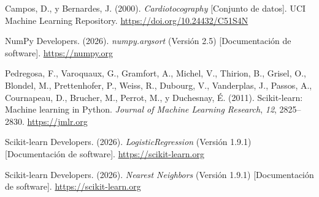 \documentclass[10pt,a4paper,twocolumn]{article}
\begin{document}
\noindent\hangindent=1.27cm
Campos, D., y Bernardes, J. (2000). \textit{Cardiotocography} [Conjunto de datos]. UCI Machine Learning Repository. \url{https://doi.org/10.24432/C51S4N}

\noindent\hangindent=1.27cm
NumPy Developers. (2026). \textit{numpy.argsort} (Versión 2.5) [Documentación de software]. \url{https://numpy.org}

\noindent\hangindent=1.27cm
Pedregosa, F., Varoquaux, G., Gramfort, A., Michel, V., Thirion, B., Grisel, O., Blondel, M., Prettenhofer, P., Weiss, R., Dubourg, V., Vanderplas, J., Passos, A., Cournapeau, D., Brucher, M., Perrot, M., y Duchesnay, É. (2011). Scikit-learn: Machine learning in Python. \textit{Journal of Machine Learning Research}, \textit{12}, 2825–2830. \url{https://jmlr.org}

\noindent\hangindent=1.27cm
Scikit-learn Developers. (2026). \textit{LogisticRegression} (Versión 1.9.1) [Documentación de software]. \url{https://scikit-learn.org}

\noindent\hangindent=1.27cm
Scikit-learn Developers. (2026). \textit{Nearest Neighbors} (Versión 1.9.1) [Documentación de software]. \url{https://scikit-learn.org}
\end{document}
